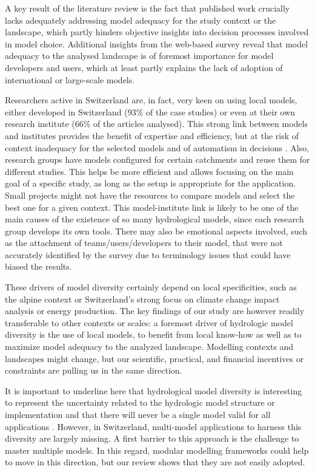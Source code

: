 \documentclass[10pt,a4paper]{article}
\begin{document}
A key result of the literature review is the fact that published work crucially lacks adequately addressing model adequacy for the study context or the landscape, which partly hinders objective insights into decision processes involved in model choice. Additional insights from the web-based survey reveal that model adequacy to the analysed landscape is of foremost importance for model developers and users, which at least partly explains the lack of adoption of international or large-scale models. 

Researchers active in Switzerland are, in fact, very keen on using local models, either developed in Switzerland (93\% of the case studies) or even at their own research institute (66\% of the articles analysed). This strong link between models and institutes provides the benefit of expertise and efficiency, but at the risk of context inadequacy for the selected models and of automatism in decisions \citep{Babel2019}. Also, research groups have models configured for certain catchments and reuse them for different studies. This helps be more efficient and allows focusing on the main goal of a specific study, as long as the setup is appropriate for the application. Small projects might not have the resources to compare models and select the best one for a given context. This model-institute link is likely to be one of the main causes of the existence of so many hydrological models, since each research group develops its own tools. There may also be emotional aspects involved, such as the attachment of teams/users/developers to their model, that were not accurately identified by the survey due to terminology issues that could have biased the results.

These drivers of model diversity certainly depend on local specificities, such as the alpine context or Switzerland's strong focus on climate change impact analysis or energy production. The key findings of our study are however readily transferable to other contexts or scales: a foremost driver of hydrologic model diversity is the use of local models, to benefit from local know-how as well as to maximize model adequacy to the analyzed landscape. Modelling contexts and landscapes might change, but our scientific, practical, and financial incentives or constraints are pulling us in the same direction.

It is important to underline here that hydrological model diversity is interesting to represent the uncertainty related to the hydrologic model structure or implementation \citep{Babel2019} and that there will never be a single model valid for all applications \citep{Hamalainen2015}. However, in Switzerland, multi-model applications to harness this diversity are largely missing. A first barrier to this approach is the challenge to master multiple models. In this regard, modular modelling frameworks could help to move in this direction, but our review shows that they are not easily adopted.
\end{document}
